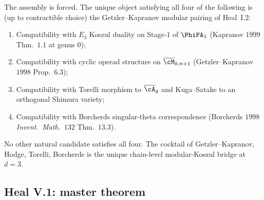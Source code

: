 The assembly is forced. The unique object satisfying all four of the
following is (up to contractible choice) the Getzler--Kapranov modular
pairing of Heal~I.$2$:
\begin{enumerate}[label=\textup{(\roman*)}]
\item Compatibility with $E_3$ Koszul duality on Stage-$1$ of
$\PhiFA_3$ (Kapranov $1999$ Thm.~$1.1$ at genus $0$);
\item Compatibility with cyclic operad structure on
$\overline{\cM}_{0, n + 1}$ (Getzler--Kapranov $1998$ Prop.~$6.3$);
\item Compatibility with Torelli morphism to
$\overline{\cA}_g$ and Kuga--Satake to an orthogonal Shimura variety;
\item Compatibility with Borcherds singular-theta correspondence
(Borcherds $1998$ \emph{Invent.\ Math.}\ $132$ Thm.~$13.3$).
\end{enumerate}
No other natural candidate satisfies all four. The cocktail of
Getzler--Kapranov, Hodge, Torelli, Borcherds is the unique chain-level
modular-Koszul bridge at $d = 3$.

\subsection*{Heal V.1: master theorem}

